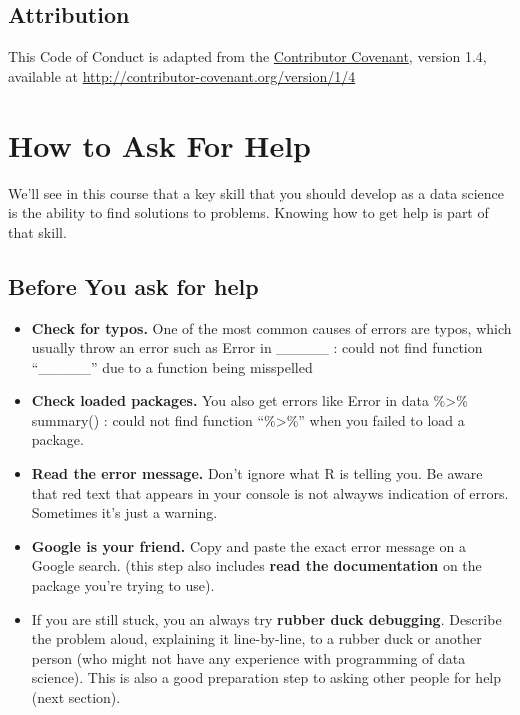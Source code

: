 \documentclass[
]{book}
\begin{document}
\hypertarget{attribution}{%
\subsection{Attribution}\label{attribution}}

This Code of Conduct is adapted from the \href{https://www.contributor-covenant.org/}{Contributor Covenant}, version 1.4, available at \url{http://contributor-covenant.org/version/1/4}

\hypertarget{how-to-ask-for-help}{%
\section{How to Ask For Help}\label{how-to-ask-for-help}}

We'll see in this course that a key skill that you should develop as a data science is the ability to find solutions to problems. Knowing how to get help is part of that skill.

\hypertarget{before-you-ask-for-help}{%
\subsection{Before You ask for help}\label{before-you-ask-for-help}}

\begin{itemize}
\item
  \textbf{Check for typos.} One of the most common causes of errors are typos, which usually throw an error such as {Error in \_\_\_\_\_ : could not find function ``\_\_\_\_\_''} due to a function being misspelled
\item
  \textbf{Check loaded packages.} You also get errors like {Error in data \%\textgreater\% summary() : could not find function ``\%\textgreater\%''} when you failed to load a package.
\item
  \textbf{Read the error message.} Don't ignore what R is telling you. Be aware that red text that appears in your console is not alwayws indication of errors. Sometimes it's just a warning.
\item
  \textbf{Google is your friend.} Copy and paste the exact error message on a Google search. (this step also includes \textbf{read the documentation} on the package you're trying to use).
\item
  If you are still stuck, you an always try \textbf{rubber duck debugging}. Describe the problem aloud, explaining it line-by-line, to a rubber duck or another person (who might not have any experience with programming of data science). This is also a good preparation step to asking other people for help (next section).
\end{itemize}
\end{document}
